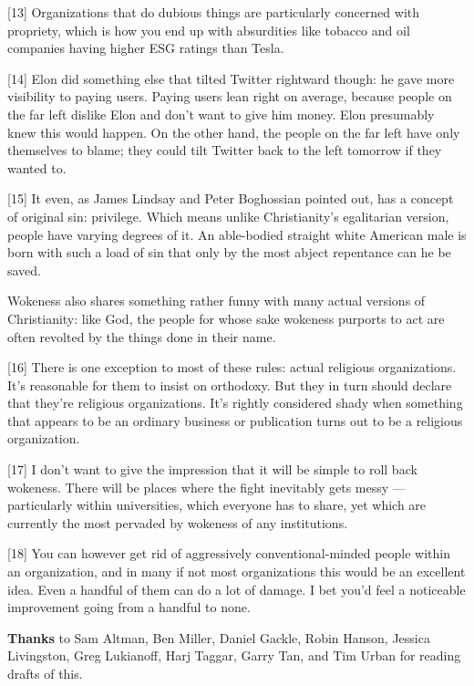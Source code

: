{[}13{]} Organizations that do dubious things are particularly concerned
with propriety, which is how you end up with absurdities like tobacco
and oil companies having higher ESG ratings than Tesla.

{[}14{]} Elon did something else that tilted Twitter rightward though:
he gave more visibility to paying users. Paying users lean right on
average, because people on the far left dislike Elon and don't want to
give him money. Elon presumably knew this would happen. On the other
hand, the people on the far left have only themselves to blame; they
could tilt Twitter back to the left tomorrow if they wanted to.

{[}15{]} It even, as James Lindsay and Peter Boghossian pointed out, has
a concept of original sin: privilege. Which means unlike Christianity's
egalitarian version, people have varying degrees of it. An able-bodied
straight white American male is born with such a load of sin that only
by the most abject repentance can he be saved.

Wokeness also shares something rather funny with many actual versions of
Christianity: like God, the people for whose sake wokeness purports to
act are often revolted by the things done in their name.

{[}16{]} There is one exception to most of these rules: actual religious
organizations. It's reasonable for them to insist on orthodoxy. But they
in turn should declare that they're religious organizations. It's
rightly considered shady when something that appears to be an ordinary
business or publication turns out to be a religious organization.

{[}17{]} I don't want to give the impression that it will be simple to
roll back wokeness. There will be places where the fight inevitably gets
messy --- particularly within universities, which everyone has to share,
yet which are currently the most pervaded by wokeness of any
institutions.

{[}18{]} You can however get rid of aggressively conventional-minded
people within an organization, and in many if not most organizations
this would be an excellent idea. Even a handful of them can do a lot of
damage. I bet you'd feel a noticeable improvement going from a handful
to none.

\textbf{Thanks} to Sam Altman, Ben Miller, Daniel Gackle, Robin Hanson,
Jessica Livingston, Greg Lukianoff, Harj Taggar, Garry Tan, and Tim
Urban for reading drafts of this.

